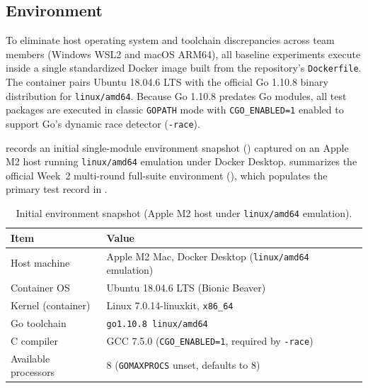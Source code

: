 \subsection{Environment}
To eliminate host operating system and toolchain discrepancies across team members (Windows WSL2 and macOS ARM64), all baseline experiments execute inside a single standardized Docker image built from the repository's \texttt{Dockerfile}. The container pairs Ubuntu 18.04.6 LTS with the official Go 1.10.8 binary distribution for \texttt{linux/amd64}. Because Go 1.10.8 predates Go modules, all test packages are executed in classic \texttt{GOPATH} mode with \texttt{CGO\_ENABLED=1} enabled to support Go's dynamic race detector (\texttt{-race}).

 records an initial single-module environment snapshot () captured on an Apple M2 host running \texttt{linux/amd64} emulation under Docker Desktop.  summarizes the official Week~2 multi-round full-suite environment (), which populates the primary test record in .

\begin{table}[H]
  \centering
  \caption{Initial environment snapshot (Apple M2 host under \texttt{linux/amd64} emulation).}
  \label{tab:env-early}
  \small
  \begin{tabularx}{\linewidth}{L{3.25cm}Y}
    \toprule
    Item & Value \\
    \midrule
    Host machine         & Apple M2 Mac, Docker Desktop (\texttt{linux/amd64} emulation) \\
    Container OS         & Ubuntu 18.04.6 LTS (Bionic Beaver) \\
    Kernel (container)   & Linux 7.0.14-linuxkit, \texttt{x86\_64} \\
    Go toolchain         & \texttt{go1.10.8 linux/amd64} \\
    C compiler           & GCC 7.5.0 (\texttt{CGO\_ENABLED=1}, required by \texttt{-race}) \\
    Available processors & 8 (\texttt{GOMAXPROCS} unset, defaults to 8) \\
    \bottomrule
  \end{tabularx}
\end{table}

